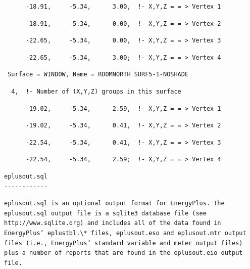 \begin{lstlisting}
      -18.91,     -5.34,      3.00,  !- X,Y,Z = = > Vertex 1
\end{lstlisting}

\begin{lstlisting}
      -18.91,     -5.34,      0.00,  !- X,Y,Z = = > Vertex 2
\end{lstlisting}

\begin{lstlisting}
      -22.65,     -5.34,      0.00,  !- X,Y,Z = = > Vertex 3
\end{lstlisting}

\begin{lstlisting}
      -22.65,     -5.34,      3.00;  !- X,Y,Z = = > Vertex 4
\end{lstlisting}

\begin{lstlisting}
 Surface = WINDOW, Name = ROOMNORTH SURF5-1-NOSHADE
\end{lstlisting}

\begin{lstlisting}
  4,  !- Number of (X,Y,Z) groups in this surface
\end{lstlisting}

\begin{lstlisting}
      -19.02,     -5.34,      2.59,  !- X,Y,Z = = > Vertex 1
\end{lstlisting}

\begin{lstlisting}
      -19.02,     -5.34,      0.41,  !- X,Y,Z = = > Vertex 2
\end{lstlisting}

\begin{lstlisting}
      -22.54,     -5.34,      0.41,  !- X,Y,Z = = > Vertex 3
\end{lstlisting}

\begin{lstlisting}
      -22.54,     -5.34,      2.59;  !- X,Y,Z = = > Vertex 4
\end{lstlisting}

\begin{lstlisting}
eplusout.sql
------------
\end{lstlisting}

\begin{lstlisting}
eplusout.sql is an optional output format for EnergyPlus. The eplusout.sql output file is a sqlite3 database file (see http://www.sqlite.org) and includes all of the data found in EnergyPlus’ eplustbl.\* files, eplusout.eso and eplusout.mtr output files (i.e., EnergyPlus’ standard variable and meter output files) plus a number of reports that are found in the eplusout.eio output file.
\end{lstlisting}

